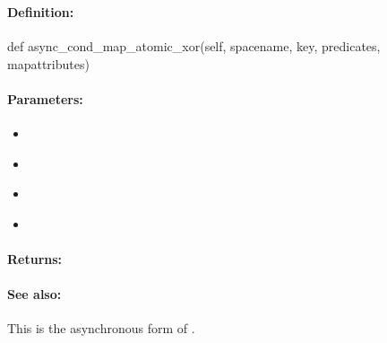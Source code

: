 \pagebreak
\subsubsection{}
\label{api:python:async_cond_map_atomic_xor}


\paragraph{Definition:}
\begin{pythoncode}
def async_cond_map_atomic_xor(self, spacename, key, predicates, mapattributes)
\end{pythoncode}

\paragraph{Parameters:}
\begin{itemize}[noitemsep]
\item {}\\

\item {}\\

\item {}\\

\item {}\\

\end{itemize}

\paragraph{Returns:}


\paragraph{See also:}  This is the asynchronous form of .

\pagebreak
\subsubsection{}
\label{api:python:group_map_atomic_xor}


